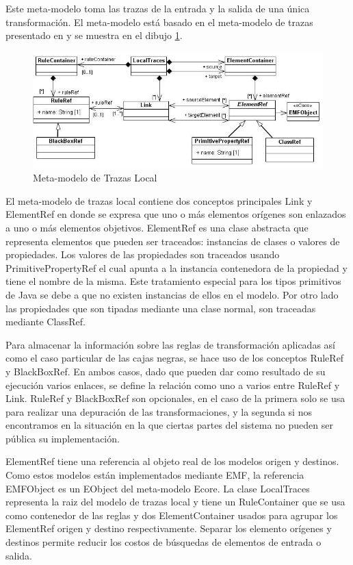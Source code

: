 \documentclass[a4paper,12pt,oneside]{book}
\begin{document}
Este meta-modelo toma las trazas de la entrada y la salida de una única transformación. El meta-modelo está basado en el meta-modelo de trazas presentado en \cite{Jouault} y se muestra en el dibujo \ref{fig:LocalTraceMetamodel}.

\begin{figure}[hbtp]
\centering
\includegraphics[scale=.55]{./img/LocalTraceMetamodel}
\caption{Meta-modelo de Trazas Local}
\label{fig:LocalTraceMetamodel}
\end{figure}

El meta-modelo de trazas local contiene dos conceptos principales Link y ElementRef en donde se expresa que uno o más elementos orígenes son enlazados a uno o más elementos objetivos. ElementRef es una clase abstracta que representa elementos que pueden ser traceados: instancias de clases o valores de propiedades. Los valores de las propiedades son traceados usando PrimitivePropertyRef el cual apunta a la instancia contenedora de la propiedad y tiene el nombre de la misma. Este tratamiento especial para los tipos primitivos de Java se debe a que no existen instancias de ellos en el modelo. Por otro lado las propiedades que son tipadas mediante una clase normal, son traceadas mediante ClassRef.

Para almacenar la información sobre las reglas de transformación aplicadas así como el caso particular de las cajas negras, se hace uso de los conceptos RuleRef y BlackBoxRef. En ambos casos, dado que pueden dar como resultado de su ejecución varios enlaces, se define la relación como uno a varios entre RuleRef y Link. RuleRef y BlackBoxRef son opcionales, en el caso de la primera solo se usa para realizar una depuración de las transformaciones, y la segunda si nos encontramos en la situación en la que ciertas partes del sistema no pueden ser pública su implementación.

ElementRef tiene una referencia al objeto real de los modelos origen y destinos. Como estos modelos están implementados mediante EMF, la referencia EMFObject es un EObject del meta-modelo Ecore. La clase LocalTraces representa la raiz del modelo de trazas local y tiene un RuleContainer que se usa como contenedor de las reglas y dos ElementContainer usados para agrupar los ElementRef origen y destino respectivamente. Separar los elemento orígenes y destinos permite reducir los costos de búsquedas de elementos de entrada o salida.
\end{document}
